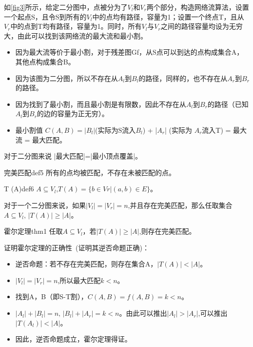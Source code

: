\begin{example}
	如\autoref{fig3}所示，给定二分图中，点被分为了\(V_l\)和\(V_r\)两个部分，构造网络流算法，设置一个起点S，且令S到所有的\(V_l\)中的点均有路径，容量为1；设置一个终点T，且从\(V_r\)中的点到T均有路径，容量为1。同时，所有\(V_l\)与\(V_r\)之间的路径容量均设为无穷大，由此可以找到该网络流的最大流和最小割。
\end{example}

\begin{itemize}
	\item 因为最大流等价于最小割，对于残差图Gf，从S点可以到达的点构成集合A，其他点构成集合B。
	\item 因为该图为二分图，所以不存在从\(A_l\)到\(B_l\)的路径，同样的，也不存在从\(A_r\)到\(B_r\)的路径。
	\item 因为找到了最小割，而且最小割是有限数，因此不存在从\(A_l\)到\(B_r\)的路径（已知\(A_l\)到\(B_r\)的边的容量为正无穷）。
	\item 最小割值 \(C(A,B) =|B_l|\)(实际为S流入\(B_l\)) + |\(A_r\)| (实际为 \(A_r\)流入T) = 最大流 = 最大匹配。
\end{itemize}
对于二分图来说 |最大匹配|=|最小顶点覆盖|。

\begin{definition}{完美匹配}{def5}
	所有的点均被匹配，不存在未被匹配的点。
\end{definition}

\begin{definition}{T (A)}{def6}
	\(A \subseteq V_l\),\(T(A) = \{b \in Vr | (a,b) \in E \} \)。
\end{definition}

对于一个二分图来说，如果\(|V_l|=|V_r|=n\),并且存在完美匹配，那么任取集合\(A \subseteq V_l,\,|T(A)| \ge |A|\)。

\begin{theorem}{霍尔定理}{thm1}
	任取\(A \subseteq V_l\)，若\(|T(A)| \ge |A|\),则存在完美匹配。
\end{theorem}
证明霍尔定理的正确性~(证明其逆否命题正确)：
\begin{itemize}
	\item 逆否命题：若不存在完美匹配，则存在集合A，\(|T(A)| < |A|\)。
	\item \(|V_l|=|V_r|=n\),所以最大匹配\(k<n\)。
	\item 找到A，B（即S-T割），\(C(A,B) = f(A,B) = k<n\)。
	\item \(|A_l|+|B_l| = n,\,|B_l|+|A_r| = k < n\)。由此可以推出\(|A_l| > |A_r|\),可以推出\(|T(A_l)| < |A|\)。
	\item 因此，逆否命题成立，霍尔定理得证。
\end{itemize}

